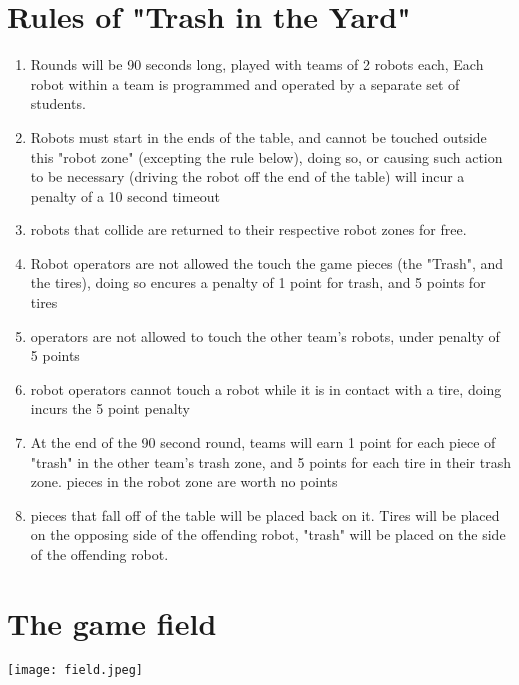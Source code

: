 \documentclass{lessonplan}
\begin{document}
    \section{Rules of "Trash in the Yard"} 
    \begin{enumerate}
      \item Rounds will be 90 seconds long, played with teams of 2
        robots each, Each robot within a team is programmed and
        operated by a separate set of students.
      \item Robots must start in the ends of the table, and cannot be
        touched outside this "robot zone" (excepting the rule below),
        doing so, or causing such action to be necessary (driving the
        robot off the end of the table) will incur a penalty of a 10
        second timeout
      \item robots that collide are returned to their respective robot
        zones for free.
      \item Robot operators are not allowed the touch the game pieces
        (the "Trash", and the tires), doing so encures a penalty of 1
        point for trash, and 5 points for tires
      \item operators are not allowed to touch the other team's
        robots, under penalty of 5 points
      \item robot operators cannot touch a robot while it is in
        contact with a tire, doing incurs the 5 point penalty
      \item At the end of the 90 second round, teams will earn 1 point
        for each piece of "trash" in the other team's trash zone, and
        5 points for each tire in their trash zone.  pieces in the
        robot zone are worth no points
      \item pieces that fall off of the table will be placed back on
        it.  Tires will be placed on the opposing side of the
        offending robot, "trash" will be placed on the side of the
        offending robot.
    \end{enumerate}
    \section{The game field}
    \texttt{[image: field.jpeg]}
\end{document}
